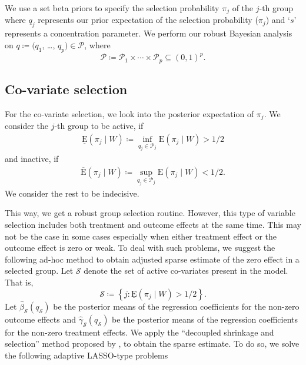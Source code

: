 \documentclass{amsart}
\newcommand{\lexp}{\underline{\text{E}}}
\newcommand{\uexp}{\overline{\text{E}}}
\begin{document}
We use a set beta priors to specify the selection probability
$\pi_j$ of the $j$-th group where  $q_j$ represents our prior expectation of the 
selection probability ($\pi_j$) and `$s$' represents a concentration parameter. We perform our
robust Bayesian analysis on $q\coloneqq(q_1$, \dots, $q_p)\in\mathcal{P}$, where
\begin{equation}
    \mathcal{P} \coloneqq \mathcal{P}_1\times\cdots\times\mathcal{P}_p\subseteq \left(0, 1\right)^{p}.
\end{equation}

\subsection{Co-variate selection}
For the co-variate selection, we look into the posterior expectation of $\pi_j$. 
We consider the $j$-th group to be active, if
\begin{align}
    \lexp (\pi_j\mid W)\coloneqq \inf_{q_j\in \mathcal{P}_j} \text{E}(\pi_j\mid W) > 1/2
\end{align}
and inactive, if
\begin{align}
    \uexp(\pi_j\mid W) \coloneqq \sup_{q_j\in \mathcal{P}_j} \text{E}(\pi_j\mid W)< 1/2.
\end{align}
We consider the rest to be indecisive. 

This way, we get a robust group selection routine. However, this type of variable 
selection includes both treatment and outcome effects at the same time. This may not be the
case in some cases especially when either treatment effect or the outcome effect is zero or
weak. To deal with such problems, we suggest the following ad-hoc method to obtain 
adjusted sparse estimate of the zero effect in a selected group.
Let $\mathcal{S}$ denote the set of active co-variates present in the model. That is,
\begin{equation}
    \mathcal{S}\coloneqq
    \left\{j : \lexp(\pi_j\mid W) > 1/2\right\}.
\end{equation}
Let $\hat{\beta}_{\mathcal{S}}(q_{\mathcal{S}})$ be the posterior means of the regression
coefficients for the non-zero outcome effects and
$\hat{\gamma}_{\mathcal{S}}(q_{\mathcal{S}})$ be the posterior means of the regression
coefficients for the non-zero treatment effects. We apply the 
``decoupled shrinkage and selection'' method proposed by \citet{hahn2015}, to obtain
the sparse estimate. To do so, we solve the following adaptive LASSO-type \cite{Zou2006}
problems
\end{document}
